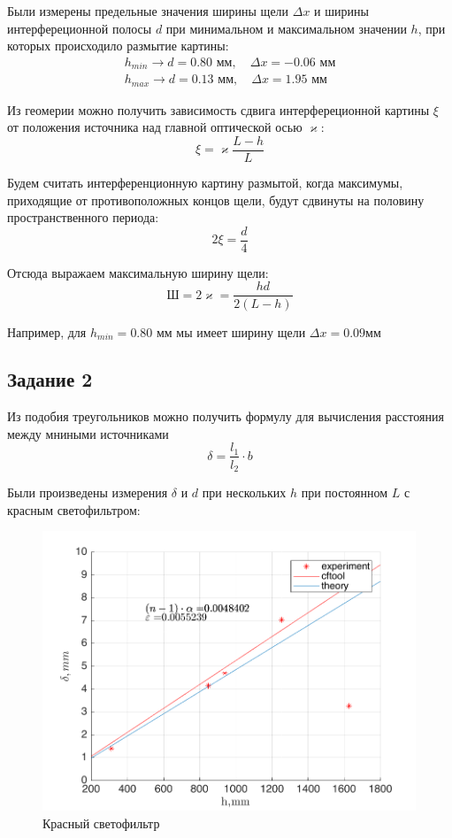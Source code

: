 Были измерены предельные значения ширины щели $\Delta x$ и ширины интерфереционной полосы $d$ при минимальном и максимальном значении $h$, при которых происходило размытие картины: 
\begin{gather*}
h_{min}\to d=0.80\text{ мм}, \quad \Delta x=-0.06\text{ мм}\\
h_{max}\to d=0.13\text{ мм}, \quad \Delta x=1.95\text{ мм} 	
\end{gather*}

Из геомерии можно получить зависимость сдвига интерфереционной картины $\xi$ от положения источника над главной оптической осью $\varkappa$: 
\begin{equation}
	\xi=\varkappa \frac{L-h}{L}
\end{equation}

Будем считать интерференционную картину размытой, когда максимумы, приходящие от противоположных концов щели, будут сдвинуты на половину пространственного периода:	
\begin{equation}
	2\xi=\frac{d}{4}
\end{equation}

Отсюда выражаем максимальную ширину щели:
\begin{equation}
	\text{Ш}=2\varkappa=\frac{hd}{2(L-h)}
\end{equation}

Например, для $h_{min}=0.80\text{ мм}$ мы имеет ширину щели $\Delta x=0.09 \text{мм}$

\newpage
\subsection{Задание 2}
Из подобия треугольников можно получить формулу для вычисления расстояния между мниными источниками 
\begin{equation}
	\delta=\frac{l_1}{l_2}\cdot b
\end{equation}

Были произведены измерения $\delta$ и $d$ при нескольких $h$ при постоянном $L$ с красным светофильтром:

\begin{figure}[H]
	\centering 
	\includegraphics[width=0.995\textwidth]{data/d_r.png}
	\caption{Красный светофильтр}
	\label{fig:d_r}
\end{figure}

